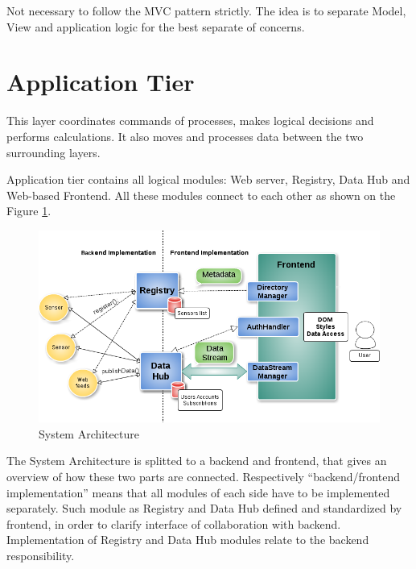   Not necessary to follow the MVC pattern strictly. The idea is to separate Model, View and application logic for the best separate of concerns.

\section{Application Tier}
  This layer coordinates commands of processes, makes logical decisions and performs calculations. It also moves and processes data between the two surrounding layers.

  Application tier contains all logical modules: Web server, Registry, Data Hub and Web-based Frontend. All these modules connect to each other as shown on the Figure \ref{img:structure}. 
    \begin{figure}[!ht]
    \centering
    \includegraphics[scale=0.6]{images/Structure.png}   
    \caption[System Architecture]{System Architecture} 
    \label{img:structure}                        
    \end{figure}

    The System Architecture is splitted to a backend and frontend, that gives an overview of how these two parts are connected. Respectively ``backend/frontend implementation'' means that all modules of each side have to be implemented separately. Such module as Registry and Data Hub defined and standardized by frontend, in order to clarify interface of collaboration with backend. Implementation of Registry and Data Hub modules relate to the backend responsibility.

